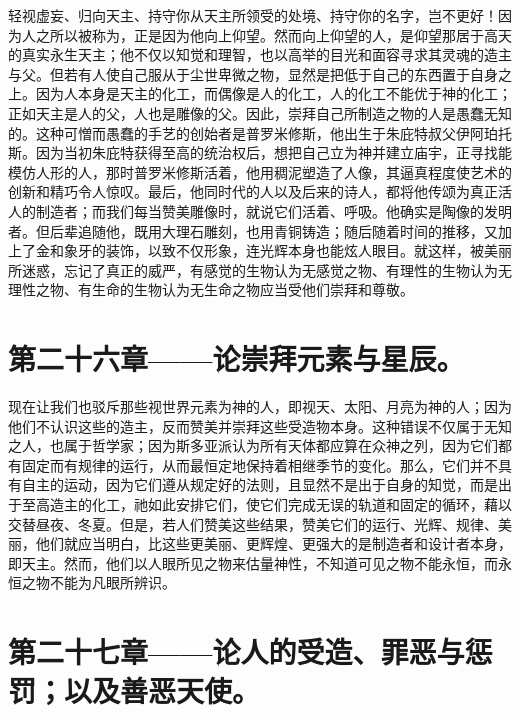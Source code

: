 轻视虚妄、归向天主、持守你从天主所领受的处境、持守你的名字，岂不更好！因为人之所以被称为，正是因为他向上仰望。然而向上仰望的人，是仰望那居于高天的真实永生天主；他不仅以知觉和理智，也以高举的目光和面容寻求其灵魂的造主与父。但若有人使自己服从于尘世卑微之物，显然是把低于自己的东西置于自身之上。因为人本身是天主的化工，而偶像是人的化工，人的化工不能优于神的化工；正如天主是人的父，人也是雕像的父。因此，崇拜自己所制造之物的人是愚蠢无知的。这种可憎而愚蠢的手艺的创始者是普罗米修斯，他出生于朱庇特叔父伊阿珀托斯。因为当初朱庇特获得至高的统治权后，想把自己立为神并建立庙宇，正寻找能模仿人形的人，那时普罗米修斯活着，他用稠泥塑造了人像，其逼真程度使艺术的创新和精巧令人惊叹。最后，他同时代的人以及后来的诗人，都将他传颂为真正活人的制造者；而我们每当赞美雕像时，就说它们活着、呼吸。他确实是陶像的发明者。但后辈追随他，既用大理石雕刻，也用青铜铸造；随后随着时间的推移，又加上了金和象牙的装饰，以致不仅形象，连光辉本身也能炫人眼目。就这样，被美丽所迷惑，忘记了真正的威严，有感觉的生物认为无感觉之物、有理性的生物认为无理性之物、有生命的生物认为无生命之物应当受他们崇拜和尊敬。\par


\section{第二十六章——论崇拜元素与星辰。}

现在让我们也驳斥那些视世界元素为神的人，即视天、太阳、月亮为神的人；因为他们不认识这些的造主，反而赞美并崇拜这些受造物本身。这种错误不仅属于无知之人，也属于哲学家；因为斯多亚派认为所有天体都应算在众神之列，因为它们都有固定而有规律的运行，从而最恒定地保持着相继季节的变化。那么，它们并不具有自主的运动，因为它们遵从规定好的法则，且显然不是出于自身的知觉，而是出于至高造主的化工，祂如此安排它们，使它们完成无误的轨道和固定的循环，藉以交替昼夜、冬夏。但是，若人们赞美这些结果，赞美它们的运行、光辉、规律、美丽，他们就应当明白，比这些更美丽、更辉煌、更强大的是制造者和设计者本身，即天主。然而，他们以人眼所见之物来估量神性，不知道可见之物不能永恒，而永恒之物不能为凡眼所辨识。\par


\section{第二十七章——论人的受造、罪恶与惩罚；以及善恶天使。}

